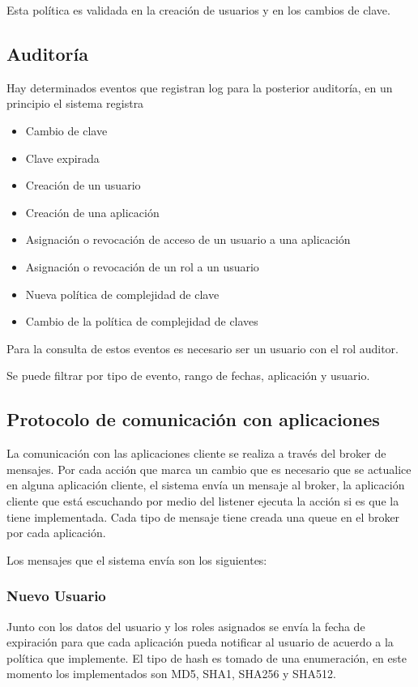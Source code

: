 Esta política es validada en la creación de usuarios y en los cambios de clave. 

\subsection{Auditoría}

Hay determinados eventos que registran log para la posterior auditoría, en un principio el sistema registra

\begin{itemize}
  \item Cambio de clave
  \item Clave expirada
  \item Creación de un usuario
  \item Creación de una aplicación
  \item Asignación o revocación de acceso de un usuario a una aplicación
  \item Asignación o revocación de un rol a un usuario
  \item Nueva política de complejidad de clave
  \item Cambio de la política de complejidad de claves
\end{itemize}

Para la consulta de estos eventos es necesario ser un usuario con el rol auditor.

Se puede filtrar por tipo de evento, rango de fechas, aplicación y usuario. %

\subsection{Protocolo de comunicación con aplicaciones}

La comunicación con las aplicaciones cliente se realiza a través del broker de mensajes.
Por cada acción que marca un cambio que es necesario que se actualice en alguna aplicación cliente, el sistema envía un mensaje al broker, la aplicación cliente que está escuchando por medio del listener ejecuta la acción si es que la tiene implementada.
Cada tipo de mensaje tiene creada una queue en el broker por cada aplicación. 

Los mensajes que el sistema envía son los siguientes:

\subsubsection{Nuevo Usuario}
Junto con los datos del usuario y los roles asignados se envía la fecha de expiración para que cada aplicación pueda notificar al usuario de acuerdo a la política que implemente.
El tipo de hash es tomado de una enumeración, en este momento los implementados son MD5, SHA1, SHA256 y SHA512.


